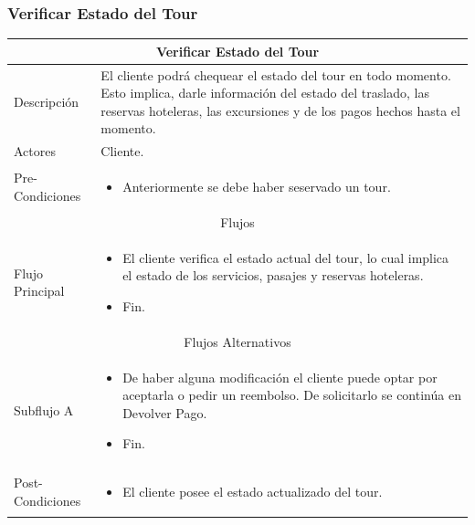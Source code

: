\documentclass[12pt,a4paper]{article}
\newenvironment{myitemize}
{\begin{itemize}[leftmargin=*,noitemsep,topsep=0pt]}{\end{itemize}}
\newenvironment{caseuse}
{\begin{center}\begin{tabular}{|l|p{10cm}|}}{\end{tabular}\end{center}}
\begin{document}
		\subsubsection{Verificar Estado del Tour}

			\begin{caseuse}
				\hline
				\multicolumn{2}{|c|}{Verificar Estado del Tour} \\ \hline

				Descripción & El cliente podrá chequear el estado del tour en todo momento. Esto implica, darle información del estado del traslado, las reservas hoteleras, las excursiones y de los pagos hechos hasta el momento. \\ \hline

				Actores & Cliente. \\ \hline

				Pre-Condiciones & 
					\begin{myitemize}
						\item Anteriormente se debe haber seservado un tour.
					\end{myitemize} \\ \hline

				\multicolumn{2}{|c|}{Flujos} \\ \hline

				Flujo Principal &
					\begin{myitemize}
						\item El cliente verifica el estado actual del tour, lo cual implica el estado de los servicios, pasajes y reservas hoteleras.
						\item Fin.
					\end{myitemize} \\ \hline

				\multicolumn{2}{|c|}{Flujos Alternativos} \\ \hline

				Subflujo A & 
					\begin{myitemize}
						\item De haber alguna modificación el cliente puede optar por aceptarla o pedir un reembolso. De solicitarlo se continúa en Devolver Pago.
						\item Fin.
					\end{myitemize} \\ \hline

				Post-Condiciones &
					\begin{myitemize}
						\item El cliente posee el estado actualizado del tour.
					\end{myitemize}\\ \hline
			\end{caseuse}
\end{document}
